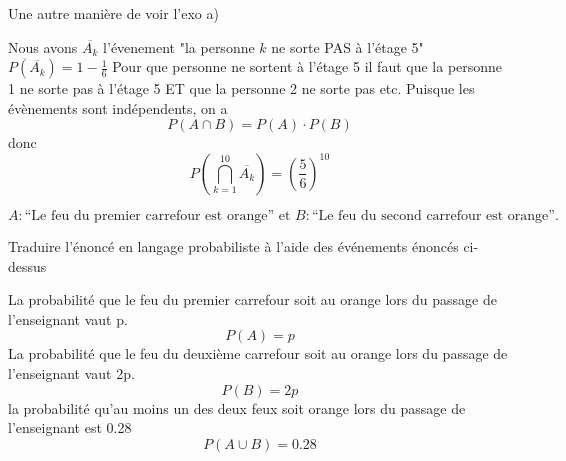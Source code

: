 \begin{exo}
\begin{subexo}{Une autre manière de voir l'exo a)}
\begin{enumerate}
			\end{enumerate}
			Nous avons $\overline{A_k}$ l'évenement "la personne $k$ ne sorte PAS à l'étage 5" $P(\overline{A_k}) = 1 -\frac{1}{6}$
			Pour que personne ne sortent à l'étage 5 il faut que la personne 1 ne sorte pas à l'étage 5 ET que la personne 2 ne sorte pas etc.
			\newline
			Puisque les évènements sont indépendents, on a $$P(A \cap B) =P(A) \cdot{ P(B)} $$
			donc $$ P\left( \bigcap_{k=1}^{10}\overline{A_{k}}\right) = \left(\frac{5}{6}\right)^{10}$$
		\end{subexo}
	\end{exo}
	
	\begin{exo}
		$$A : \text{“Le feu du premier carrefour est orange” et } B : \text{“Le feu du second carrefour est orange”.}$$
		\begin{subexo}{Traduire l'énoncé en langage probabiliste à l'aide des événements énoncés ci-dessus}
			
			La probabilité que le feu du premier carrefour soit au orange lors du passage de l'enseignant vaut p.
			$$P(A) = p$$
			La probabilité que le feu du deuxième carrefour soit au orange lors du passage de l'enseignant vaut 2p.
			$$P(B) = 2p$$
			la
			probabilité qu’au moins un des deux feux soit orange lors du passage de l’enseignant est 0.28
			$$P(A\cup B) = 0.28$$
			

\end{subexo}
\end{exo}
